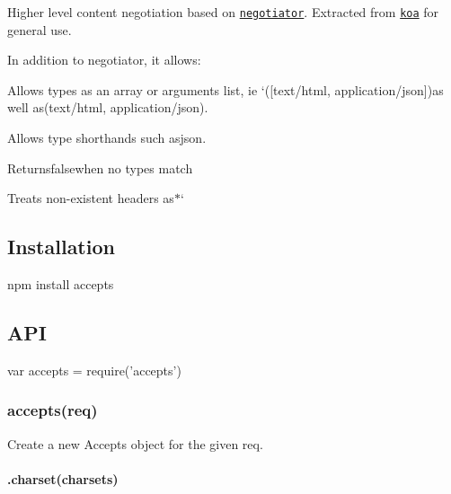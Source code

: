\href{https://npmjs.org/package/accepts}{\tt } \href{https://npmjs.org/package/accepts}{\tt } \href{http://nodejs.org/download/}{\tt } \href{https://travis-ci.org/jshttp/accepts}{\tt } \href{https://coveralls.io/r/jshttp/accepts}{\tt }

Higher level content negotiation based on \href{https://www.npmjs.com/package/negotiator}{\tt negotiator}. Extracted from \href{https://www.npmjs.com/package/koa}{\tt koa} for general use.

In addition to negotiator, it allows\+:


\begin{DoxyItemize}
\item Allows types as an array or arguments list, ie `(\mbox{[}\textquotesingle{}text/html\textquotesingle{}, \textquotesingle{}application/json\textquotesingle{}\mbox{]}){\ttfamily as well as}(\textquotesingle{}text/html\textquotesingle{}, \textquotesingle{}application/json\textquotesingle{}){\ttfamily .}
\item {\ttfamily Allows type shorthands such as}json{\ttfamily .}
\item {\ttfamily Returns}false{\ttfamily when no types match}
\item {\ttfamily Treats non-\/existent headers as}$\ast$`
\end{DoxyItemize}

\subsection*{Installation}


\begin{DoxyCode}
npm install accepts
\end{DoxyCode}


\subsection*{A\+PI}


\begin{DoxyCode}
var accepts = require('accepts')
\end{DoxyCode}


\subsubsection*{accepts(req)}

Create a new {\ttfamily Accepts} object for the given {\ttfamily req}.

\paragraph*{.charset(charsets)}


